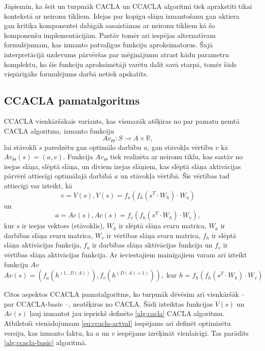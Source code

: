 \documentclass{ludis} %
\begin{document}
Jāpiemin, ka šeit un turpmāk CACLA un CCACLA algoritmi tiek aprakstīti tikai
kontekstā ar neironu tīkliem. Idejas par kopīgu slāņu izmantošanu gan aktiera
gan kritiķa komponentei dabīgāk sasaistāmas ar neironu tīkliem kā šo komponenšu
implementācijām. Pastāv tomēr arī iespējas alternatīvam formulējumam, kas
izmanto patvaļīgus funkciju aproksimatorus. Šajā interpretācijā uzdevums
pārvēršas par mēģinājumu atrast kādu parametru komplektu, ko šie funkciju
aproksimētāji varētu dalīt savā starpā, tomēr šāds vispārīgāks formulējums darbā
netiek apskatīts.

\subsection{CCACLA pamatalgoritms}
CCACLA vienkāršākais variants, kas vismazāk atšķiras no par pamatu ņemtā CACLA
algoritma, izmanto funkciju 
\begin{equation}
  Av_\Theta:S \rightarrow A \times \mathbb{R},
\end{equation}
lai stāvoklī $s$ paredzētu gan optimālo darbību $a$, gan stāvokļa vērtību $v$ kā
$Av_\Theta(s) = (a, v)$. Funkcija $Av_\Theta$ tiek realizēta ar
neironu tīklu, kas sastāv no ieejas slāņa, slēptā slāņa, un diviem izejas
slāņiem, kas slēptā slāņa aktivācijas pārvērš attiecīgi optimālajā darbībā
$a$ un stāvokļa vērtībā. Šīs vērtības tad attiecīgi var izteikt, kā
\begin{equation}\label{eq:ccacla-act}
  v = V(s), V(s) = f_a\left(f_h(s^T \cdot W_h) \cdot W_a\right)
\end{equation} un
\begin{equation}\label{eq:ccacla-val}
  a = Ac(s), Ac(s) = f_v\left(f_h(s^T \cdot W_h) \cdot W_v\right),
\end{equation} kur $s$ ir
ieejas vektors (stāvoklis), $W_h$ ir slēptā slāņa svaru matrica, $W_a$ ir
darbības slāņa svaru matrica, $W_v$ ir vērtības slāņa svaru matrica, $f_h$ ir
slēptā slāņa aktivācijas funkcija, $f_a$ ir darbības slāņa aktivācijas funkcija
un $f_v$ ir vērtības slāņa aktivācijas funkcija. Ar ieviestajiem mainīgajiem
varam arī izteikt funkciju $Av$
\begin{equation}\label{eq:ccacla-actval}
  Av(s) = \left(f_a(h^{(1 \ldots D(A))}), f_v(h^{(D(A) + 1)})\right), \text{ kur } 
  h = f_h\left(f_h(s^T \cdot W_h) \cdot W_v\right)
\end{equation}

Citos aspektos CCACLA pamatalgoritms, ko turpmāk dēvēsim arī vienkāršāk -- par
CCACLA-basic --, neatšķiras no CACLA. Šādi izteiktas funkcijas
$V(s)$ un $Ac(s)$ ļauj izmantot jau iepriekš definēto \ref{alg:cacla} CACLA
algoritmu. Atbilstoši vienādojumam \ref{eq:ccacla-actval} iespējams
arī definēt optimizētu versiju, kas izmanto faktu, ka $a$ un $v$ iespējams
izrēķināt vienlaicīgi. Tas parādīts \ref{alg:ccacla-basic} algoritmā.
\end{document}
